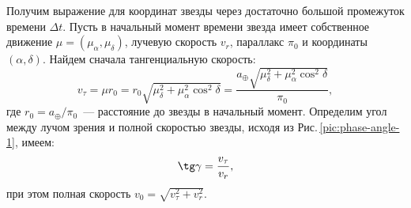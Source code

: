 \begin{figure}[h!]
\begin{subfigure}[b]{0.47\tw}
		\caption{}
		\label{pic:phase-angle-2}
	\end{subfigure}
	\caption{}
\end{figure}

Получим выражение для координат звезды через достаточно большой промежуток времени $\Delta t$. Пусть в начальный момент времени звезда имеет собственное движение $\mu = (\mu_\alpha, \mu_\delta)$, лучевую скорость $v_r$, параллакс $\pi_0$ и координаты $(\alpha, \delta)$. Найдем сначала тангенциальную скорость:
\begin{equation*}
	v_\tau =  \mu r_0 = r_0 \sqrt{ \mu_\delta^2 + \mu_\alpha^2 \cos^2 \delta} = \frac{a_\oplus \sqrt{ \mu_\delta^2 + \mu_\alpha^2 \cos^2 \delta}}{\pi_0},
\end{equation*}
где $r_0 = a_\oplus / \pi_0$~--- расстояние до звезды в начальный момент.
Определим угол между лучом зрения и полной скоростью звезды, исходя из Рис.\,\ref{pic:phase-angle-1}, имеем:
\begin{equation*}
	\tg \gamma = \frac{v_\tau}{v_r},
\end{equation*}
при этом полная скорость $v_0 = \sqrt{v_\tau^2 + v_r^2}$. 

